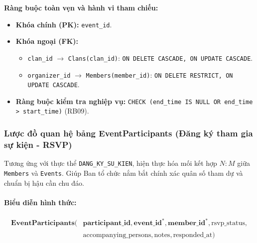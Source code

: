 \noindent\textbf{Ràng buộc toàn vẹn và hành vi tham chiếu:}
\begin{itemize}[noitemsep,topsep=2pt]
    \item \textbf{Khóa chính (PK):} \texttt{event\_id}.
    \item \textbf{Khóa ngoại (FK):}
    \begin{itemize}[noitemsep]
        \item \texttt{clan\_id} $\rightarrow$ \texttt{Clans(clan\_id)}: \texttt{ON DELETE CASCADE, ON UPDATE CASCADE}.
        \item \texttt{organizer\_id} $\rightarrow$ \texttt{Members(member\_id)}: \texttt{ON DELETE RESTRICT, ON UPDATE CASCADE}.
    \end{itemize}
    \item \textbf{Ràng buộc kiểm tra nghiệp vụ:} \texttt{CHECK (end\_time IS NULL OR end\_time > start\_time)} (RB09).
\end{itemize}

\subsubsection{Lược đồ quan hệ bảng EventParticipants (Đăng ký tham gia sự kiện - RSVP)}
Tương ứng với thực thể \texttt{DANG\_KY\_SU\_KIEN}, hiện thực hóa mối kết hợp $N:M$ giữa \texttt{Members} và \texttt{Events}. Giúp Ban tổ chức nắm bắt chính xác quân số tham dự và chuẩn bị hậu cần chu đáo.

\paragraph{Biểu diễn hình thức:}
\[
\begin{aligned}
\textbf{EventParticipants}\big(
&\underline{\textbf{participant\_id}}, \textbf{event\_id}^*, \textbf{member\_id}^*, \text{rsvp\_status}, \\
&\text{accompanying\_persons}, \text{notes}, \text{responded\_at}
\big)
\end{aligned}
\]

